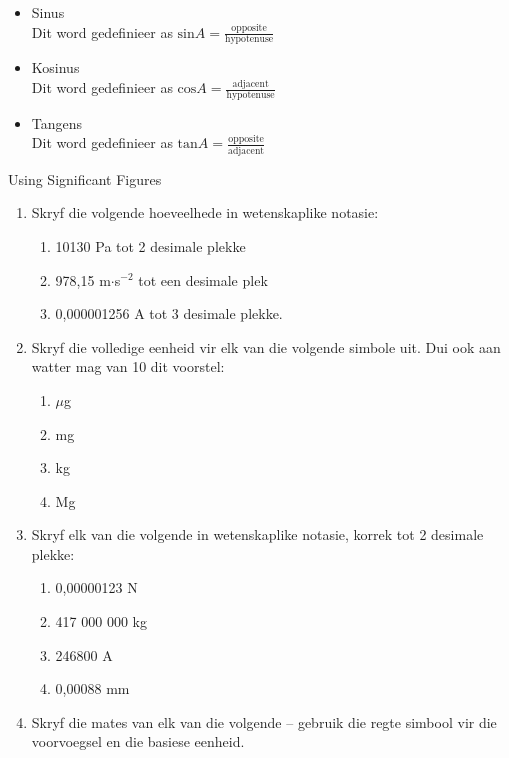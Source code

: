 \begin{itemize}
 \item Sinus\\
Dit word gedefinieer as $\text{sin} A = \frac{\text{opposite}}{\text{hypotenuse}}$
\item Kosinus \\
Dit word gedefinieer as $\text{cos} A = \frac{\text{adjacent}}{\text{hypotenuse}}$
\item Tangens \\
Dit word gedefinieer as $\text{tan} A = \frac{\text{opposite}}{\text{adjacent}}$
\end{itemize}
\begin{exercises}{Using Significant Figures }
            \nopagebreak
\begin{enumerate}[noitemsep, label=\textbf{\arabic*}. ] 
\item Skryf die volgende hoeveelhede in wetenskaplike notasie:
\begin{enumerate}[noitemsep, label=\textbf{\alph*}. ] 
\item 10130 Pa tot 2 desimale plekke
\item 978,15 m$\ensuremath{\cdot}$s${}^{-2}$ tot een desimale plek
\item 0,000001256 A tot 3 desimale plekke.
\end{enumerate}
\item Skryf die volledige eenheid vir elk van die volgende simbole uit. Dui ook aan watter mag van 10 dit voorstel:
  \begin{enumerate}[noitemsep, label=\textbf{\alph*}. ] 
  \item $\mu $g
  \item mg
  \item kg
  \item Mg
  \end{enumerate}
\item Skryf elk van die volgende in wetenskaplike notasie, korrek tot 2 desimale plekke:
  \begin{enumerate}[noitemsep, label=\textbf{\alph*}. ] 
  \item 0,00000123 N
  \item 417 000 000 kg
  \item 246800 A
  \item 0,00088 mm
  \end{enumerate}
\item Skryf die mates van elk van die volgende – gebruik die regte simbool vir die voorvoegsel en die basiese eenheid.
  \begin{enumerate}[noitemsep, label=\textbf{\alph*}. ] 

\end{enumerate}
\end{enumerate}
\end{exercises}
